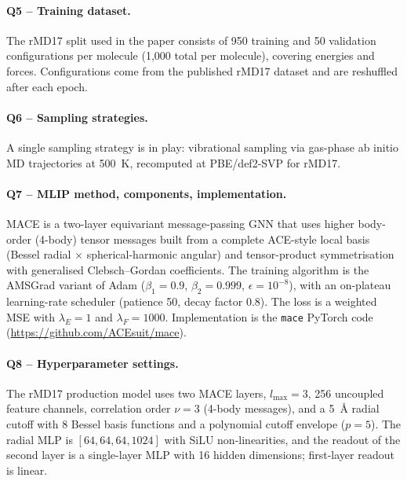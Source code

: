 \paragraph{Q5 -- Training dataset.}
The rMD17 split used in the paper consists of 950 training and 50
validation configurations per molecule (1{,}000 total per molecule),
covering energies and forces. Configurations come from the published
rMD17 dataset and are reshuffled after each epoch.


\paragraph{Q6 -- Sampling strategies.}
A single sampling strategy is in play: vibrational sampling via
gas-phase ab initio MD trajectories at 500~K, recomputed at
PBE/def2-SVP for rMD17.


\paragraph{Q7 -- MLIP method, components, implementation.}
MACE is a two-layer equivariant message-passing GNN that uses
higher body-order (4-body) tensor messages built from a complete
ACE-style local basis (Bessel radial $\times$ spherical-harmonic
angular) and tensor-product symmetrisation with generalised
Clebsch--Gordan coefficients. The training algorithm is the
AMSGrad variant of Adam ($\beta_1=0.9$, $\beta_2=0.999$,
$\epsilon=10^{-8}$), with an on-plateau learning-rate scheduler
(patience 50, decay factor 0.8). The loss is a weighted MSE with
$\lambda_E=1$ and $\lambda_F=1000$. Implementation is the
\texttt{mace} PyTorch code (\url{https://github.com/ACEsuit/mace}).


\paragraph{Q8 -- Hyperparameter settings.}
The rMD17 production model uses two MACE layers, $l_{\max}=3$, 256
uncoupled feature channels, correlation order $\nu=3$ (4-body
messages), and a 5~\AA{} radial cutoff with 8 Bessel basis
functions and a polynomial cutoff envelope ($p=5$). The radial MLP
is $[64, 64, 64, 1024]$ with SiLU non-linearities, and the readout
of the second layer is a single-layer MLP with 16 hidden
dimensions; first-layer readout is linear.


